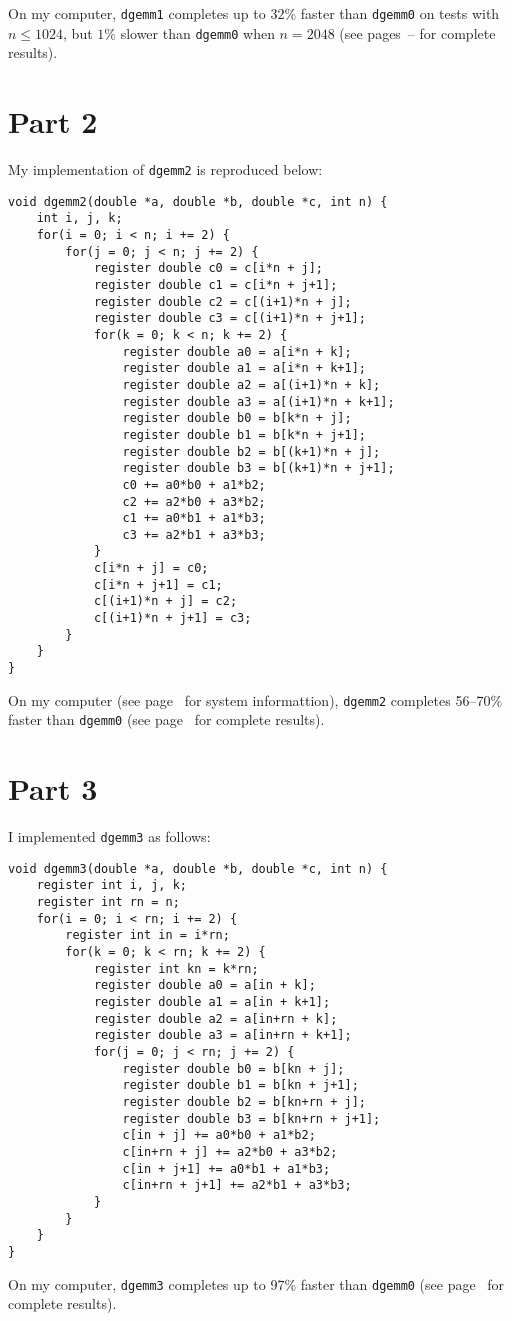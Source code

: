 \documentclass[12pt,letterpaper,oneside]{article}
\begin{document}
On my computer, \texttt{dgemm1} completes up to $32\%$ faster than \texttt{dgemm0} 
on tests with $n\le1024$, but $1\%$ slower than \texttt{dgemm0} when $n=2048$ 
(see pages~\pageref{results0}--\pageref{results1} for complete results).

\section*{Part 2}
My implementation of \texttt{dgemm2} is reproduced below:
\begin{verbatim}
void dgemm2(double *a, double *b, double *c, int n) {
    int i, j, k;
    for(i = 0; i < n; i += 2) {
        for(j = 0; j < n; j += 2) {
            register double c0 = c[i*n + j];
            register double c1 = c[i*n + j+1];
            register double c2 = c[(i+1)*n + j];
            register double c3 = c[(i+1)*n + j+1];
            for(k = 0; k < n; k += 2) {
                register double a0 = a[i*n + k];
                register double a1 = a[i*n + k+1];
                register double a2 = a[(i+1)*n + k];
                register double a3 = a[(i+1)*n + k+1];
                register double b0 = b[k*n + j];
                register double b1 = b[k*n + j+1];
                register double b2 = b[(k+1)*n + j];
                register double b3 = b[(k+1)*n + j+1];
                c0 += a0*b0 + a1*b2;
                c2 += a2*b0 + a3*b2;
                c1 += a0*b1 + a1*b3;
                c3 += a2*b1 + a3*b3;
            }
            c[i*n + j] = c0;
            c[i*n + j+1] = c1;
            c[(i+1)*n + j] = c2;
            c[(i+1)*n + j+1] = c3;
        }
    }
}
\end{verbatim}
On my computer (see page~\pageref{specs} for system informattion), \texttt{dgemm2} completes 56--70\% faster than \texttt{dgemm0} 
(see page~\pageref{results2} for complete results).


 
\section*{Part 3}
I implemented \texttt{dgemm3} as follows:
\begin{verbatim}
void dgemm3(double *a, double *b, double *c, int n) {
    register int i, j, k;
    register int rn = n;
    for(i = 0; i < rn; i += 2) {
        register int in = i*rn;
        for(k = 0; k < rn; k += 2) {
            register int kn = k*rn;
            register double a0 = a[in + k];
            register double a1 = a[in + k+1];
            register double a2 = a[in+rn + k];
            register double a3 = a[in+rn + k+1];
            for(j = 0; j < rn; j += 2) {
                register double b0 = b[kn + j];
                register double b1 = b[kn + j+1];
                register double b2 = b[kn+rn + j];
                register double b3 = b[kn+rn + j+1];
                c[in + j] += a0*b0 + a1*b2;
                c[in+rn + j] += a2*b0 + a3*b2;
                c[in + j+1] += a0*b1 + a1*b3;
                c[in+rn + j+1] += a2*b1 + a3*b3;
            }
        }
    }
}
\end{verbatim}
On my computer, \texttt{dgemm3} completes up to 97\% faster than \texttt{dgemm0} 
(see page~\pageref{results3} for complete results).
\end{document}
